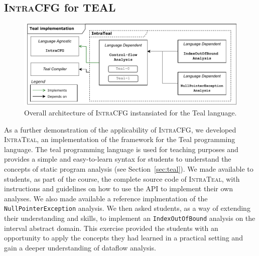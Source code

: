 \subsection{\textsc{IntraCFG} for TEAL}
\begin{figure}[H]
    \centering
    \includegraphics[scale=0.65]{kappa/img/architectureteal.pdf}
    \caption{\label{fig:IntraTeal} Overall architecture of \textsc{IntraCFG} instansiated for the Teal language.}
\end{figure}
As a further demonstration of the applicability of \textsc{IntraCFG},
we developed \textsc{IntraTeal}, an implementation of the framework for the Teal programming language.
The teal programming language is used for teaching purposes
and provides a simple and easy-to-learn syntax for students to understand the
concepts of static program analysis (see Section~\ref{sec:teal}).
We made available to students, as part of the course, the complete source code of \textsc{IntraTeal},
with instructions and guidelines on how to use the API to implement their own analyses.
We also made available a reference implmentation of the
\texttt{NullPointerException} analysis. We then asked students, as a way of
extending their understanding and skills, to implement an \texttt{IndexOutOfBound}
analysis on the interval abstract domain. This exercise provided the
students with an opportunity to apply the concepts they had learned in a practical
setting and gain a deeper understanding of dataflow analysis.

